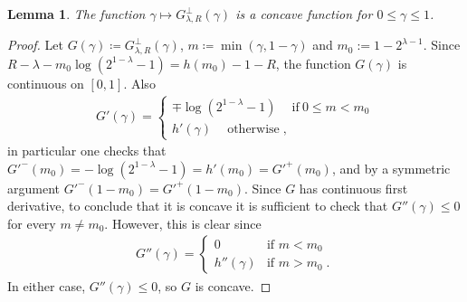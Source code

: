\documentclass{article}
\theoremstyle{plain}
\theoremstyle{plain}
\theoremstyle{plain}
\theoremstyle{plain}
\theoremstyle{plain}
\theoremstyle{plain}
\theoremstyle{plain}
\newtheorem{lemma}[definition]{Lemma}%
\theoremstyle{plain}
\theoremstyle{plain}
\theoremstyle{plain}
\theoremstyle{remark}
\theoremstyle{remark}
\theoremstyle{remark}
\theoremstyle{plain}
\begin{document}
\begin{lemma}
    \label{lem:F_dual_convex}
          The function $\gamma\mapsto G^{\perp}_{\lambda,R}(\gamma)$ is a concave function for $0\le\gamma\le 1$.
\end{lemma}
\begin{proof}
  Let $G(\gamma)\coloneqq G^\perp_{\lambda,R}(\gamma)$,
  $m\coloneqq\min(\gamma,1-\gamma)$ and $m_0:=1-2^{\lambda-1}$. 
  Since $R-\lambda-m_0\log(2^{1-\lambda}-1)=h(m_0)-1-R$,
  the function $G(\gamma)$ is continuous on $[0,1]$. 
  Also 
\begin{align*}
    G'(\gamma)=\begin{cases}
            \mp\log(2^{1-\lambda}-1) \quad\ \text{if}\ 0\le m<m_0\\h'(\gamma)\quad\ \text{otherwise}\;,
        \end{cases}
\end{align*}
in particular one checks that
$G'^{-}(m_0)=-\log(2^{1-\lambda}-1)=h'(m_0)=G'^{+}(m_0)$, and by a symmetric argument
$G'^-(1-m_0)=G'^+(1-m_0)$. Since $G$ has continuous first derivative,
to conclude that it is concave
it is sufficient to check that
$G''(\gamma)\le 0$ for every $m\ne m_0$.
However, this is clear since
    \begin{align*}
        G''(\gamma)=\begin{cases}
            0 &\text{if }m<m_0\\
            h''(\gamma)&\text{if } m>m_0\;.
        \end{cases}
    \end{align*}
    In either case, $G''(\gamma)\le 0$, so $G$ is concave.
\end{proof}
\end{document}
